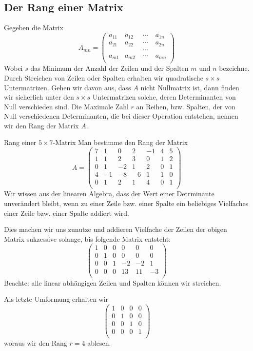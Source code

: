 \subsection{Der Rang einer Matrix}
Gegeben die Matrix
\begin{equation}
  A_{mn}=
  \begin{pmatrix}
    a_{11}&a_{12}&\;\cdots\;&a_{1n}\\
    a_{21}&a_{22}&\;\cdots\;&a_{2n}\\
    & &\;\cdots\;&\\
    a_{m1}&a_{m2}&\;\cdots\;&a_{mn}\\
  \end{pmatrix}
  \label{eq:Matrixmn}
\end{equation}
Wobei $s$ das Minimum der Anzahl der Zeilen und der Spalten $m$ und $n$
bezeichne. Durch Streichen von Zeilen oder Spalten erhalten wir quadratische
$s\times s$ Untermatrizen. Gehen wir davon aus, dass $A$ nicht Nullmatrix ist,
dann finden wir sicherlich unter den $s\times s$ Untermatrizen solche, deren
Determinanten von Null verschieden sind. Die Maximale Zahl $r$ an Reihen, bzw.
Spalten, der von Null verschiedenen Determinanten, die bei dieser Operation
entstehen, nennen wir den Rang der Matrix $A$.
\begin{example}{Rang einer $5\times7$-Matrix}
  Man bestimme den Rang der Matrix
  \[
    A=\begin{pmatrix}
    7&1&0&2&-1&4&5\\
    1&1&2&3& 0&1&2\\
    0&1&-2&1&2&0&1\\
    4&-1&-8&-6&1&1&0\\
    0&1&2&1&4&0&1\\
    \end{pmatrix}
  \]
  Wir wissen aus der linearen Algebra, dass der Wert einer Detrminante
  unverändert bleibt, wenn zu einer Zeile bzw. einer Spalte ein beliebiges
  Vielfaches einer Zeile bzw. einer Spalte addiert wird.

  Dies machen wir uns zunutze und addieren Vielfache der Zeilen der obigen
  Matrix sukzessive solange, bis folgende Matrix entsteht: 
  \[
    \begin{pmatrix}
    1&0&0&0&0&0\\
    0&1&0&0&0&0\\
    0&0&1&-2&-2&1\\
    0&0&0&13&11&-3\\
    \end{pmatrix}
  \]
  Beachte: alle linear abhängigen Zeilen und Spalten können wir streichen. 
  
  Als letzte Umformung erhalten wir
  \[
     \begin{pmatrix}
    1&0&0&0\\
    0&1&0&0\\
    0&0&1&0\\
    0&0&0&1\\
    \end{pmatrix}
  \]
  woraus wir den Rang $r=4$ ablesen.
\end{example}
\newpage